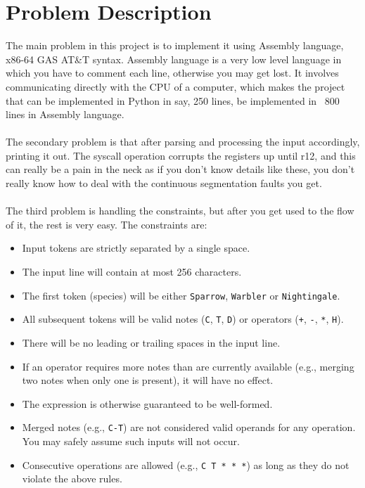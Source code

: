 \documentclass[a4paper,12pt]{article}
\begin{document}
\section{Problem Description}
The main problem in this project is to implement it using Assembly language, x86-64 GAS AT\&T syntax. Assembly language is a very low level language in which you have to comment each line, otherwise you may get lost. It involves communicating directly with the CPU of a computer, which makes the project that can be implemented in Python in say, 250 lines, be implemented in ~800 lines in Assembly language.\\\\ The secondary problem is that after parsing and processing the input accordingly, printing it out. The syscall operation corrupts the registers up until r12, and this can really be a pain in the neck as if you don't know details like these, you don't really know how to deal with the continuous segmentation faults you get.\\\\ The third problem is handling the constraints, but after you get used to the flow of it, the rest is very easy. The constraints are:\begin{itemize}
    \item Input tokens are strictly separated by a single space.
    \item The input line will contain at most 256 characters.
    \item The first token (species) will be either \verb|Sparrow|, \verb|Warbler| or \verb|Nightingale|.
    \item All subsequent tokens will be valid notes (\verb|C|, \verb|T|, \verb|D|) or operators (\verb|+|, \verb|-|, \verb|*|, \verb|H|).
    \item There will be no leading or trailing spaces in the input line.
    \item If an operator requires more notes than are currently available (e.g., merging two notes when only one is present), it will have no effect.
    \item The expression is otherwise guaranteed to be well-formed.
    \item Merged notes (e.g., \verb|C-T|) are not considered valid operands for any operation. You may safely assume such inputs will not occur.
    \item Consecutive operations are allowed (e.g., \verb|C T * * *|) as long as they do not violate the above rules.
\end{itemize}
\end{document}
